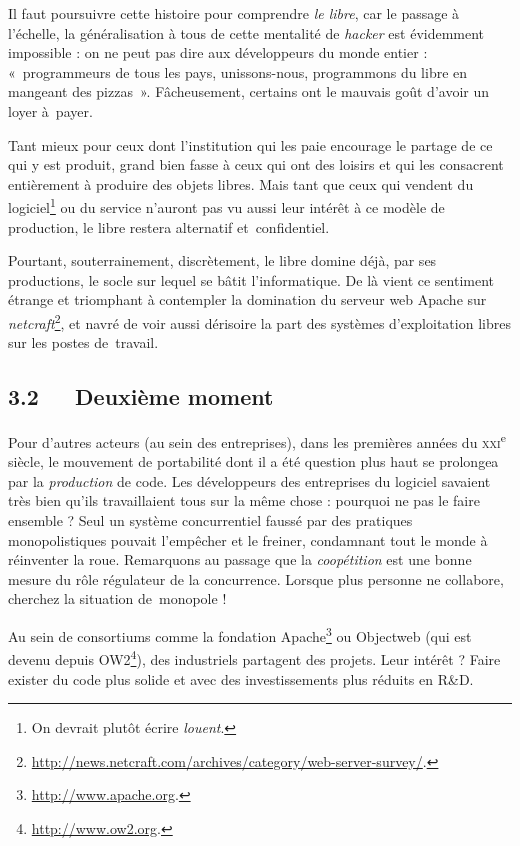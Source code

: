 \documentclass{FramateX}
\begin{document}
\begin{refsection}
Il faut poursuivre cette histoire pour comprendre \textit{le libre}, car
le passage à l'échelle, la généralisation à tous de cette mentalité de
\textit{hacker }est évidemment impossible : on ne peut pas dire aux
développeurs du monde entier : «~programmeurs de tous les pays,
unissons-nous, programmons du libre en mangeant des pizzas~».
Fâcheusement, certains ont le mauvais goût d'avoir un loyer à~payer.

Tant mieux pour ceux dont l'institution qui les paie encourage le
partage de ce qui y est produit, grand bien fasse à ceux qui ont des
loisirs et qui les consacrent entièrement à produire des objets libres.
Mais tant que ceux qui vendent du logiciel\footnote{On devrait plutôt
écrire \textit{louent}.} ou du service n'auront pas vu aussi leur
intérêt à ce modèle de production, le libre restera alternatif
et~confidentiel.

Pourtant, souterrainement, discrètement, le libre domine déjà, par ses
productions, le socle sur lequel se bâtit l'informatique. De là vient
ce sentiment étrange et triomphant à contempler la domination du
serveur web Apache sur
\textit{netcraft}\footnote{\url{http://news.netcraft.com/archives/category/web-server-survey/}.},
et navré de voir aussi dérisoire la part des systèmes d'exploitation
libres sur les postes de~travail.

\subsection*{3.2~~~Deuxième moment}
{}


Pour d'autres acteurs (au sein des entreprises), dans les premières
années du \textsc{xxi}\textsuperscript{e} siècle, le mouvement de
portabilité dont il a été question plus haut se prolongea par la
\textit{production} de code. Les développeurs des entreprises du
logiciel savaient très bien qu'ils travaillaient tous sur la même chose
: pourquoi ne pas le faire ensemble ? Seul un système concurrentiel
faussé par des pratiques monopolistiques pouvait l'empêcher et le
freiner, condamnant tout le monde à réinventer la roue. Remarquons au
passage que la \textit{coopétition} est une bonne mesure du rôle
régulateur de la concurrence. Lorsque plus personne ne collabore,
cherchez la situation de~monopole !

Au sein de consortiums comme la fondation
Apache\footnote{\url{http://www.apache.org}.} ou Objectweb (qui est devenu
depuis OW2\footnote{\url{http://www.ow2.org}.}), des industriels partagent
des projets. Leur intérêt ? Faire exister du code plus solide et avec
des investissements plus réduits en R\&D. 


\end{refsection}
\end{document}
